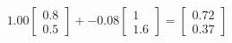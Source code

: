 \documentclass[preview]{standalone}
\begin{document}
\begin{align*}
1.00 \begin{bmatrix} 0.8 \\ 0.5 \end{bmatrix} + -0.08 \begin{bmatrix} 1 \\ 1.6 \end{bmatrix} = \begin{bmatrix} 0.72 \\ 0.37 \end{bmatrix}
\end{align*}
\end{document}
